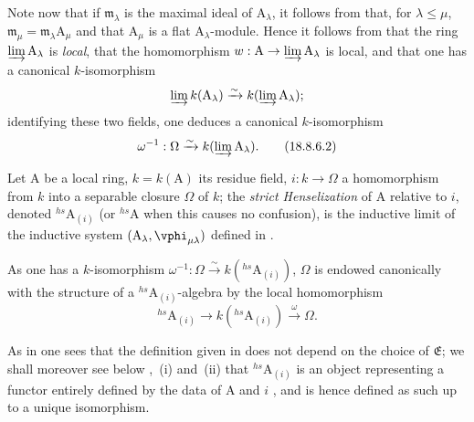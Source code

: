 \begin{env}[18.8.6]
Note now that if $\mathfrak{m}_\lambda$ is the maximal ideal of $\mathrm{A}_\lambda$, it follows from  that, for $\lambda\leq\mu$, $\mathfrak{m}_\mu=\mathfrak{m}_\lambda\mathrm{A}_\mu$ and that $\mathrm{A}_\mu$ is a flat $\mathrm{A}_\lambda$-module.
Hence it follows from  that the ring $\varinjlim\mathrm{A}_\lambda$ is \emph{local}, that the homomorphism $w:\mathrm{A}\to\varinjlim\mathrm{A}_\lambda$ is local, and that one has a canonical $k$-isomorphism
\[
  \varinjlim k(\mathrm{A}_\lambda)\xrightarrow{\sim}k(\varinjlim\mathrm{A}_\lambda);
\]
identifying these two fields, one deduces a canonical $k$-isomorphism
\begin{equation}
  \omega^{-1}:\Omega\xrightarrow{\sim}k(\varinjlim\mathrm{A}_\lambda).
  \label{IV.18.8.6.2}
\tag{18.8.6.2}
\end{equation}
\end{env}

\begin{definition}[18.8.7]
\label{IV.18.8.7}
Let $\mathrm{A}$ be a local ring, $k=k(\mathrm{A})$ its residue field, $i:k\to\Omega$ a homomorphism from $k$ into a separable closure $\Omega$ of $k$;
the \emph{strict Henselization} of $\mathrm{A}$ relative to $i$, denoted ${}^{hs}\!\mathrm{A}_{(i)}$ (or ${}^{hs}\!\mathrm{A}$ when this causes no confusion), is the inductive limit of the inductive system $(\mathrm{A}_\lambda,\vphi_{\mu\lambda})$ defined in .
\end{definition}

As one has a $k$-isomorphism $\omega^{-1}:\Omega\xrightarrow{\sim}k({}^{hs}\!\mathrm{A}_{(i)})$, $\Omega$ is endowed canonically with the structure of a ${}^{hs}\!\mathrm{A}_{(i)}$-algebra by the local homomorphism
\[
  {}^{hs}\!\mathrm{A}_{(i)}\to k({}^{hs}\!\mathrm{A}_{(i)})\xrightarrow{\omega}\Omega.
\]

As in  one sees that the definition given in  does not depend on the choice of $\mathfrak{E}$;
we shall moreover see below ,~(i) and~(ii) that ${}^{hs}\!\mathrm{A}_{(i)}$ is an object representing a functor entirely defined by the data of A and $i$ , and is hence defined as such up to a unique isomorphism.

